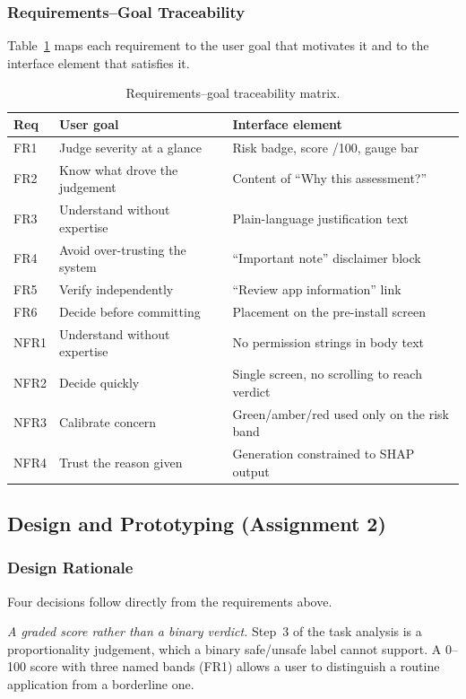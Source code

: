 \documentclass[sigconf]{acmart}
\begin{document}
\subsubsection{Requirements--Goal Traceability}
Table~\ref{tab:trace} maps each requirement to the user goal that motivates
it and to the interface element that satisfies it.

\begin{table}[t]
\caption{Requirements--goal traceability matrix.}
\label{tab:trace}
\small
\begin{tabular}{@{}p{}p{}p{}@{}}
\toprule
\textbf{Req} & \textbf{User goal} & \textbf{Interface element} \\
\midrule
FR1 & Judge severity at a glance & Risk badge, score /100, gauge bar \\
FR2 & Know what drove the judgement & Content of ``Why this assessment?'' \\
FR3 & Understand without expertise & Plain-language justification text \\
FR4 & Avoid over-trusting the system & ``Important note'' disclaimer block \\
FR5 & Verify independently & ``Review app information'' link \\
FR6 & Decide before committing & Placement on the pre-install screen \\
NFR1 & Understand without expertise & No permission strings in body text \\
NFR2 & Decide quickly & Single screen, no scrolling to reach verdict \\
NFR3 & Calibrate concern & Green/amber/red used only on the risk band \\
NFR4 & Trust the reason given & Generation constrained to SHAP output \\
\bottomrule
\end{tabular}
\end{table}

\subsection{Design and Prototyping (Assignment 2)}

\subsubsection{Design Rationale}
Four decisions follow directly from the requirements above.

\emph{A graded score rather than a binary verdict.} Step~3 of the task
analysis is a proportionality judgement, which a binary safe/unsafe label
cannot support. A 0--100 score with three named bands (FR1) allows a user
to distinguish a routine application from a borderline one.
\end{document}
